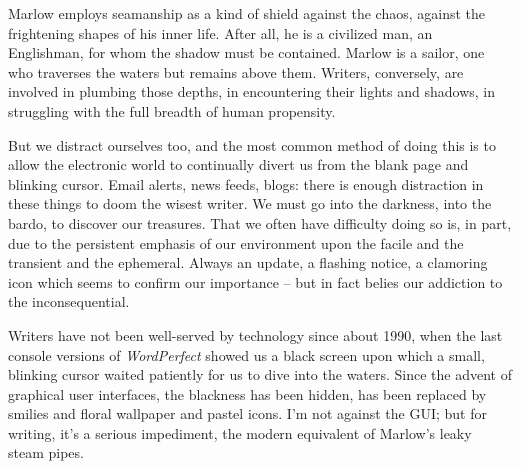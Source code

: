 \documentclass[10pt,DIV09,letterpaper,oneside,headsepline]{scrreprt}
\begin{document}
Marlow employs seamanship as a kind of shield against the chaos,
against the frightening shapes of his inner life. After all, he is a
civilized man, an Englishman, for whom the shadow must be contained.
Marlow is a sailor, one who traverses the waters but remains above
them. Writers, conversely, are involved in plumbing those depths, in
encountering their lights and shadows, in struggling with the full
breadth of human propensity.

But we distract ourselves too, and the most common method of doing
this is to allow the electronic world to continually divert us from
the blank page and blinking cursor. Email alerts, news feeds, blogs:
there is enough distraction in these things to doom the wisest writer.
We must go into the darkness, into the bardo, to discover our
treasures. That we often have difficulty doing so is, in part, due to
the persistent emphasis of our environment upon the facile and the
transient and the ephemeral. Always an update, a flashing notice, a
clamoring icon which seems to confirm our importance -- but in fact
belies our addiction to the inconsequential.

Writers have not been well-served by technology since about 1990, when
the last console versions of \textit{WordPerfect\/} showed us a black
screen upon which a small, blinking cursor waited patiently for us to
dive into the waters. Since the advent of graphical user interfaces,
the blackness has been hidden, has been replaced by smilies and floral
wallpaper and pastel icons. I'm not against the \textsc{GUI}; but for
writing, it's a serious impediment, the modern equivalent of Marlow's
leaky steam pipes.
\end{document}
